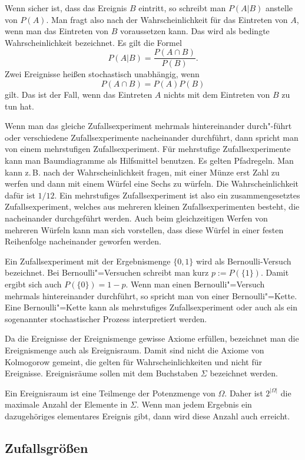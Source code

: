 \documentclass[a4paper,10pt,fleqn,twocolumn,twoside]{article}
\begin{document}
Wenn sicher ist, dass das Ereignis $B$ eintritt, so schreibt
man $P(A|B)$ anstelle von $P(A)$. Man fragt also nach der
Wahrscheinlichkeit für das Eintreten von $A$, wenn man das Eintreten
von $B$ voraussetzen kann. Das wird als bedingte Wahrscheinlichkeit
bezeichnet. Es gilt die Formel
\[P(A|B) = \frac{P(A\cap B)}{P(B)}.\]
Zwei Ereignisse heißen stochastisch unabhängig, wenn
\[P(A\cap B) = P(A)P(B)\]
gilt. Das ist der Fall, wenn das Eintreten $A$ nichts mit dem
Eintreten von $B$ zu tun hat.

Wenn man das gleiche Zufallsexperiment mehrmals hintereinander
durch"-führt oder verschiedene Zufallsexperimente nacheinander
durchführt, dann spricht man von einem mehrstufigen
Zufallsexperiment. Für mehrstufige Zufallsexperimente kann man
Baumdiagramme als Hilfsmittel benutzen. Es gelten Pfadregeln.
Man kann z.\,B. nach der Wahrscheinlichkeit fragen, mit einer Münze
erst Zahl zu werfen und dann mit einem Würfel eine Sechs zu würfeln.
Die Wahrscheinlichkeit dafür ist $1/12$. Ein mehrstufiges
Zufallsexperiment ist also ein zusammengesetztes Zufallsexperiment,
welches aus mehreren kleinen Zufallsexperimenten besteht, die
nacheinander durchgeführt werden. Auch beim gleichzeitigen Werfen
von mehreren Würfeln kann man sich vorstellen, dass diese Würfel
in einer festen Reihenfolge nacheinander geworfen werden.

Ein Zufallsexperiment mit der Ergebnismenge $\{0,1\}$ wird als
Bernoulli-Versuch bezeichnet. Bei Bernoulli"=Versuchen schreibt man
kurz $p:=P(\{1\})$. Damit ergibt sich auch $P(\{0\})=1-p$.
Wenn man einen Bernoulli"=Versuch mehrmals hintereinander durchführt,
so spricht man von einer Bernoulli"=Kette. Eine Bernoulli"=Kette kann
als mehrstufiges Zufallsexperiment oder auch als ein sogenannter
stochastischer Prozess interpretiert werden.

Da die Ereignisse der Ereignismenge gewisse Axiome erfüllen,
bezeichnet man die Ereignismenge auch als Ereignisraum. Damit
sind nicht die Axiome von Kolmogorow gemeint, die gelten für
Wahrscheinlichkeiten und nicht für Ereignisse. Ereignisräume
sollen mit dem Buchstaben $\Sigma$ bezeichnet werden.

Ein Ereignisraum ist eine Teilmenge der Potenzmenge von $\Omega$.
Daher ist $2^{|\Omega|}$ die maximale Anzahl der Elemente in
$\Sigma$. Wenn man jedem Ergebnis ein dazugehöriges elementares
Ereignis gibt, dann wird diese Anzahl auch erreicht.

\subsection{Zufallsgrößen}
\end{document}
